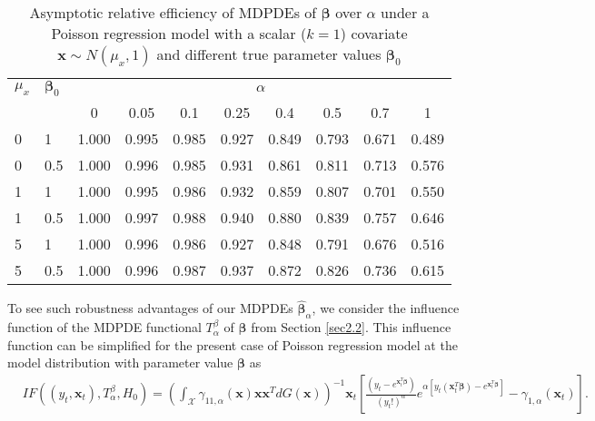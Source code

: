 \documentclass[a4paper]{article}%
\begin{document}
\begin{table}[h]
\caption{Asymptotic relative efficiency of MDPDEs of $\boldsymbol{\beta}$ over
$\alpha$ under a Poisson regression model with a scalar ($k=1$) covariate
$\boldsymbol{x}\sim N(\mu_{x}, 1)$  and different true parameter values
$\boldsymbol{\beta}_{0}$}%
\label{TAB:ARE}%
\centering
\begin{tabular}
[c]{|l|l|cccccccc|}\hline
$\mu_{x}$ & $\boldsymbol{\beta}_{0}$ & \multicolumn{8}{c|}{$\alpha$}\\
&  & 0 & 0.05 & 0.1 & 0.25 & 0.4 & 0.5 & 0.7 & 1\\\hline\hline
0 & 1 & 1.000 & 0.995 & 0.985 & 0.927 & 0.849 & 0.793 & 0.671 & 0.489\\
0 & 0.5 & 1.000 & 0.996 & 0.985 & 0.931 & 0.861 & 0.811 & 0.713 & 0.576\\
1 & 1 & 1.000 & 0.995 & 0.986 & 0.932 & 0.859 & 0.807 & 0.701 & 0.550\\
1 & 0.5 & 1.000 & 0.997 & 0.988 & 0.940 & 0.880 & 0.839 & 0.757 & 0.646\\
5 & 1 & 1.000 & 0.996 & 0.986 & 0.927 & 0.848 & 0.791 & 0.676 & 0.516\\
5 & 0.5 & 1.000 & 0.996 & 0.987 & 0.937 & 0.872 & 0.826 & 0.736 &
0.615\\\hline
\end{tabular}
\end{table}

To see such robustness advantages of our MDPDEs $\widehat{\boldsymbol{\beta}%
}_{\alpha}$, we consider the influence function of the MDPDE functional
${T}_{\alpha}^{\beta}$ of $\boldsymbol{\beta}$ from Section
\ref{sec2.2}. This influence function can be simplified for the present case
of Poisson regression model at the model distribution with parameter value
$\boldsymbol{\beta}$ as
\begin{align}
&  IF((y_{t}, \boldsymbol{x}_{t}), {T}_{\alpha}^{\beta}, H_{0}) =
\left(  {\int_{\mathcal{X}}}\gamma_{11,\alpha}(\boldsymbol{x})\boldsymbol{x}%
\boldsymbol{x}^{T}dG(\boldsymbol{x})\right)  ^{-1} \boldsymbol{x}_{t} \left[
\frac{(y_{t} - e^{\boldsymbol{x}_{t}^{T}\boldsymbol{\beta}})}{(y_{t}%
!)^{\alpha}} e^{\alpha\left[  y_{t}(\boldsymbol{x}_{t}^{T}\boldsymbol{\beta})
- e^{\boldsymbol{x}_{t}^{T}\boldsymbol{\beta}}\right]  } - \gamma_{1,\alpha
}(\boldsymbol{x}_{t})\right]  .\nonumber
\end{align}
\end{document}
